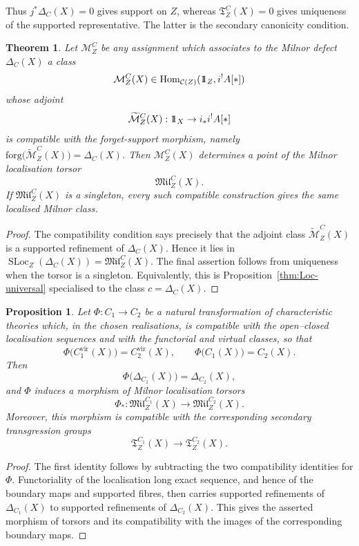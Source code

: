 \documentclass[10pt,a4paper,dvipsnames,x11names]{amsart}
\newcommand{\one}{1\hskip-3.5pt1}
\newcommand{\C}{\mathcal C}
\newcommand{\Hom}{\mathrm{Hom}}
\newcommand{\forg}{\mathrm{forg}}
\newcommand{\SLoc}{\operatorname{SLoc}}
\newcommand{\TLoc}{\mathfrak T}
\numberwithin{equation}{section}
\theoremstyle{plain}
\newtheorem{theorem}{Theorem}[section]
\newtheorem{proposition}[proposition]{Proposition}
\theoremstyle{definition}
\theoremstyle{remark}
\begin{document}
Thus $j^*\Delta_C(X)=0$ gives support on $Z$, whereas $\TLoc^C_Z(X)=0$ gives uniqueness of the supported representative.  The latter is the secondary canonicity condition.

\begin{theorem}\label{thm:milnor-characterisation}
Let $\mathcal M^C_Z$ be any assignment which associates to the Milnor defect $\Delta_C(X)$ a class
\[
\mathcal M^C_Z(X)\in \Hom_{\C(Z)}(\one_Z,i^!A[*])
\]
whose adjoint
\[
\widetilde{\mathcal M}^C_Z(X):\one_X\to i_*i^!A[*]
\]
is compatible with the forget-support morphism, namely
$
\forg\bigl(\widetilde{\mathcal M}^C_Z(X)\bigr)=\Delta_C(X)$.
Then $\mathcal M^C_Z(X)$ determines a point of the Milnor localisation torsor
\[
\mathfrak{Mil}^C_Z(X).
\]
If $\mathfrak{Mil}^C_Z(X)$ is a singleton, every such compatible construction gives the same localised Milnor class.
\end{theorem}

\begin{proof}
The compatibility condition says precisely that the adjoint class $\widetilde{\mathcal M}^C_Z(X)$ is a supported refinement of $\Delta_C(X)$.  Hence it lies in $\SLoc_Z(\Delta_C(X))=\mathfrak{Mil}^C_Z(X)$.  The final assertion follows from uniqueness when the torsor is a singleton.  Equivalently, this is Proposition~\ref{thm:Loc-universal} specialised to the class $c=\Delta_C(X)$.
\end{proof}

\begin{proposition}\label{prop:milnor-comparison}
Let
$
\Phi:C_1\longrightarrow C_2
$
be a natural transformation of characteristic theories which, in the chosen realisations, is compatible with the open--closed localisation sequences and with the functorial and virtual classes, so that
\[
\Phi\bigl(C^{\mathrm{vir}}_1(X)\bigr)=C^{\mathrm{vir}}_2(X),
\qquad
\Phi\bigl(C_1(X)\bigr)=C_2(X).
\]
Then
\[
\Phi\bigl(\Delta_{C_1}(X)\bigr)=\Delta_{C_2}(X),
\]
and $\Phi$ induces a morphism of Milnor localisation torsors
\[
\Phi_*:
\mathfrak{Mil}^{C_1}_Z(X)
\longrightarrow
\mathfrak{Mil}^{C_2}_Z(X).
\]
Moreover, this morphism is compatible with the corresponding secondary transgression groups
\[
\TLoc^{C_1}_Z(X)\longrightarrow \TLoc^{C_2}_Z(X).
\]
\end{proposition}

\begin{proof}
The first identity follows by subtracting the two compatibility identities for $\Phi$.  Functoriality of the localisation long exact sequence, and hence of the boundary maps and supported fibres, then carries supported refinements of $\Delta_{C_1}(X)$ to supported refinements of $\Delta_{C_2}(X)$.  This gives the asserted morphism of torsors and its compatibility with the images of the corresponding boundary maps.
\end{proof}
\end{document}
